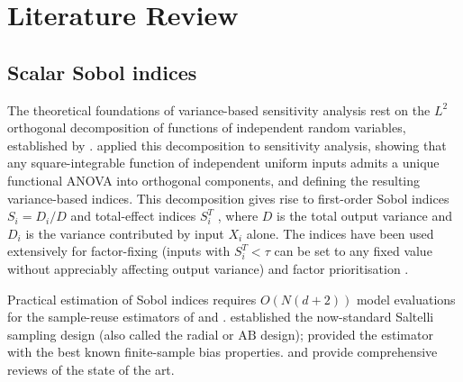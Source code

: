 \documentclass[11pt,onecolumn]{article}
\begin{document}
\section{Literature Review}
\label{sec:litreview}

\subsection{Scalar Sobol indices}
\label{sec:lit_scalar}

The theoretical foundations of variance-based sensitivity analysis rest on the
$L^2$ orthogonal decomposition of functions of independent random variables,
established by \citet{Hoeffding1948}. \citet{Sobol1993} applied this decomposition
to sensitivity analysis, showing that any square-integrable function of independent
uniform inputs admits a unique functional ANOVA into orthogonal components, and
defining the resulting variance-based indices. This decomposition gives rise to
first-order Sobol indices $S_i = D_i / D$ and total-effect indices $S_i^T$
\citep{Homma1996}, where $D$ is the total output variance and $D_i$ is the
variance contributed by input $X_i$ alone. The indices have been used extensively for factor-fixing (inputs with
$S_i^T < \tau$ can be set to any fixed value without appreciably affecting
output variance) and factor prioritisation
\citep{Saltelli2008,SaltelliStatSci2000,SaltelliInPractice2004}.

Practical estimation of Sobol indices requires $O(N(d+2))$ model evaluations
for the sample-reuse estimators of \citet{Saltelli2002} and \citet{Jansen1999}.
\citet{Saltelli2002} established the now-standard Saltelli sampling design
(also called the radial or $\mathrm{AB}$ design); \citet{Jansen1999} provided
the estimator with the best known finite-sample bias properties.
\citet{Pianosi2016} and \citet{Razavi2021} provide comprehensive reviews of
the state of the art.
\end{document}
